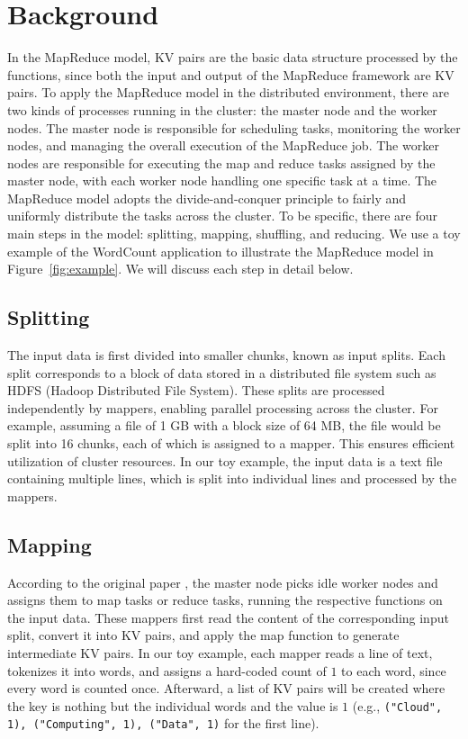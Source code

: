 \section{Background}
\label{sec:background}



In the MapReduce model, KV pairs are the basic data structure processed by the functions, since both the input and output of the MapReduce framework are KV pairs. To apply the MapReduce model in the distributed environment, there are two kinds of processes running in the cluster: the master node and the worker nodes. The master node is responsible for scheduling tasks, monitoring the worker nodes, and managing the overall execution of the MapReduce job. The worker nodes are responsible for executing the map and reduce tasks assigned by the master node, with each worker node handling one specific task at a time. The MapReduce model adopts the divide-and-conquer principle to fairly and uniformly distribute the tasks across the cluster. To be specific, there are four main steps in the model: splitting, mapping, shuffling, and reducing. We use a toy example of the WordCount application to illustrate the MapReduce model in Figure~\ref{fig:example}. We will discuss each step in detail below.

\subsection{Splitting}

The input data is first divided into smaller chunks, known as input splits. Each split corresponds to a block of data stored in a distributed file system such as HDFS (Hadoop Distributed File System). These splits are processed independently by mappers, enabling parallel processing across the cluster. For example, assuming a file of 1 GB with a block size of 64 MB, the file would be split into 16 chunks, each of which is assigned to a mapper. This ensures efficient utilization of cluster resources. In our toy example, the input data is a text file containing multiple lines, which is split into individual lines and processed by the mappers.

\subsection{Mapping}

According to the original paper \cite{dean2008mapreduce}, the master node picks idle worker nodes and assigns them to map tasks or reduce tasks, running the respective functions on the input data. These mappers first read the content of the corresponding input split, convert it into KV pairs, and apply the map function to generate intermediate KV pairs. In our toy example, each mapper reads a line of text, tokenizes it into words, and assigns a hard-coded count of $1$ to each word, since every word is counted once. Afterward, a list of KV pairs will be created where the key is nothing but the individual words and the value is $1$ (e.g., \texttt{("Cloud", 1), ("Computing", 1), ("Data", 1)} for the first line). 


